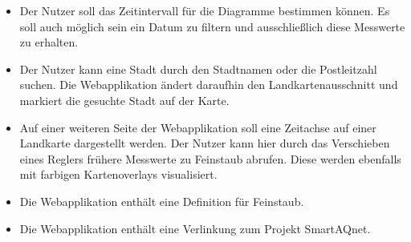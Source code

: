 \begin{itemize}
	\item Der Nutzer soll das Zeitintervall für die Diagramme bestimmen können. Es soll auch möglich sein ein Datum zu filtern und ausschließlich diese Messwerte zu erhalten.
	\item Der Nutzer kann eine Stadt durch den Stadtnamen oder die Postleitzahl suchen. Die Webapplikation ändert daraufhin den Landkartenausschnitt und markiert die gesuchte Stadt auf der Karte.
	\item Auf einer weiteren Seite der Webapplikation soll eine Zeitachse auf einer Landkarte dargestellt werden. Der Nutzer kann hier durch das Verschieben eines Reglers frühere Messwerte zu \gls{Feinstaub} abrufen. Diese werden ebenfalls mit farbigen \glspl{Kartenoverlay} visualisiert.
	\item Die Webapplikation enthält eine Definition für \gls{Feinstaub}.
	\item Die Webapplikation enthält eine Verlinkung zum Projekt \gls{SmartAQnet}. 
\end{itemize}
